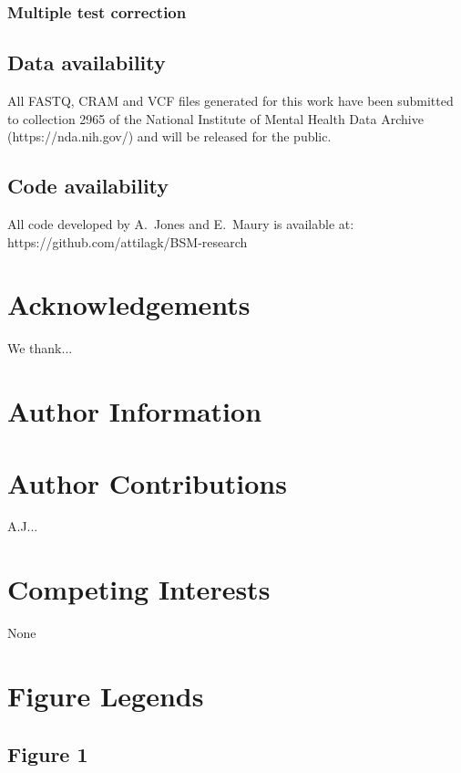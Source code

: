 \documentclass[letterpaper]{article}
\begin{document}
\subsubsection*{Multiple test correction}

\subsection*{Data availability}

All FASTQ, CRAM and VCF files generated for this work have been submitted to
collection 2965 of the National Institute of Mental Health Data Archive
(https://nda.nih.gov/) and will be released for the public.

\subsection*{Code availability}

All code developed by A.~Jones and E.~Maury is available at:\\
https://github.com/attilagk/BSM-research




\section*{Acknowledgements}

We thank...

\section*{Author Information}

\section*{Author Contributions}

A.J...

\section*{Competing Interests}

None

\section*{Figure Legends}

\subsection*{Figure 1}
\end{document}
